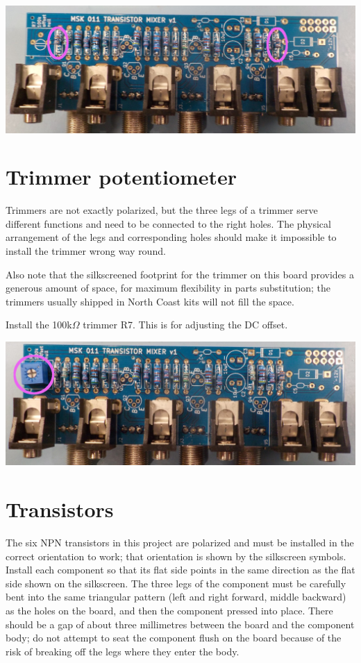 \nopagebreak
\noindent\includegraphics[width=\linewidth]{res-330k.jpg}

\section{Trimmer potentiometer}

Trimmers are not exactly polarized, but the three legs of a trimmer serve
different functions and need to be connected to the right holes.  The
physical arrangement of the legs and corresponding holes should make it
impossible to install the trimmer wrong way round.

Also note that the silkscreened footprint for the trimmer on this board
provides a generous amount of space, for maximum flexibility in parts
substitution; the trimmers usually shipped in North Coast kits will not fill
the space.

Install the 100k$\Omega$ trimmer R7.  This is for adjusting the DC offset.

\nopagebreak
\noindent\includegraphics[width=\linewidth]{pot-100k.jpg}

\section{Transistors}

The six NPN transistors in this project are polarized and must be installed
in the correct orientation to work; that orientation is shown by the
silkscreen symbols.  Install each component so that its flat side points in
the same direction as the flat side shown on the silkscreen.  The three legs
of the component must be carefully bent into the same triangular pattern
(left and right forward, middle backward) as the holes on the board, and
then the component pressed into place.  There should be a gap of about three
millimetres between the board and the component body; do not attempt to seat
the component flush on the board because of the risk of breaking off the
legs where they enter the body.

